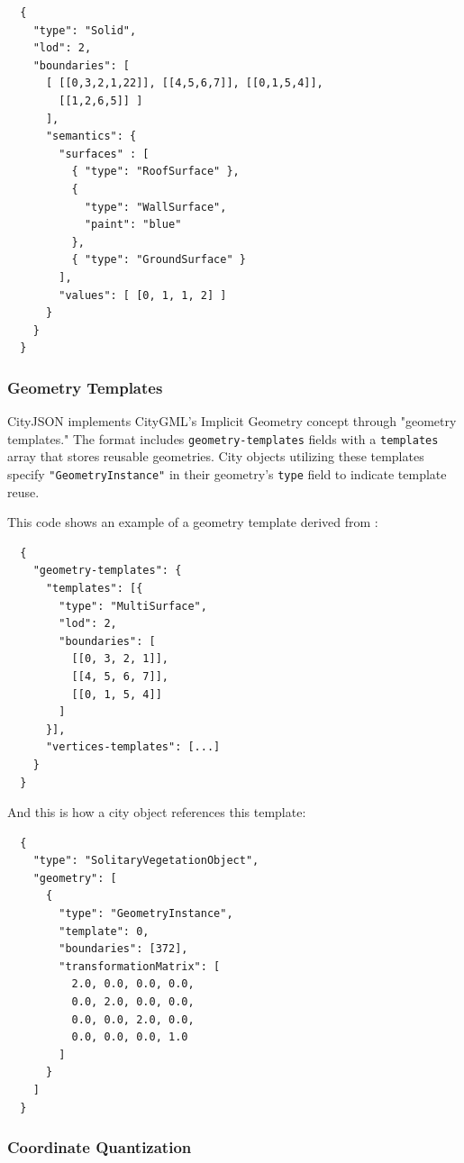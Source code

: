 \begin{lstlisting}
  {
    "type": "Solid",
    "lod": 2,
    "boundaries": [
      [ [[0,3,2,1,22]], [[4,5,6,7]], [[0,1,5,4]],
        [[1,2,6,5]] ]
      ],
      "semantics": {
        "surfaces" : [
          { "type": "RoofSurface" },
          {
            "type": "WallSurface",
            "paint": "blue"
          },
          { "type": "GroundSurface" }
        ],
        "values": [ [0, 1, 1, 2] ]
      }
    }
  }
\end{lstlisting}

\subsubsection{Geometry Templates}
\label{rw:cityjson:geometry_templates}

CityJSON implements CityGML's Implicit Geometry concept through "geometry templates." The format includes \texttt{geometry-templates} fields with a \texttt{templates} array that stores reusable geometries. City objects utilizing these templates specify \texttt{"GeometryInstance"} in their geometry's \texttt{type} field to indicate template reuse.

This code shows an example of a geometry template derived from \citet{ledoux_2019}:

\begin{lstlisting}
  {
    "geometry-templates": {
      "templates": [{
        "type": "MultiSurface",
        "lod": 2,
        "boundaries": [
          [[0, 3, 2, 1]],
          [[4, 5, 6, 7]],
          [[0, 1, 5, 4]]
        ]
      }],
      "vertices-templates": [...]
    }
  }
\end{lstlisting}

And this is how a city object references this template:

\begin{lstlisting}
  {
    "type": "SolitaryVegetationObject",
    "geometry": [
      {
        "type": "GeometryInstance",
        "template": 0,
        "boundaries": [372],
        "transformationMatrix": [
          2.0, 0.0, 0.0, 0.0,
          0.0, 2.0, 0.0, 0.0,
          0.0, 0.0, 2.0, 0.0,
          0.0, 0.0, 0.0, 1.0
        ]
      }
    ]
  }
\end{lstlisting}

\subsubsection{Coordinate Quantization}
\label{rw:cityjson:coordinate_quantisation}

